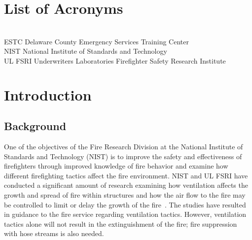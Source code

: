 \documentclass[12pt,oneside]{book}
\begin{document}
\cleardoublepage
{}
{}
\tableofcontents

\cleardoublepage
{}
{}
\listoffigures

\cleardoublepage
{}
{}
\listoftables

\chapter{List of Acronyms}

\begin{tabbing}
\hspace{1.5in} \= \\
ESTC \> Delaware County Emergency Services Training Center \\
NIST \> National Institute of Standards and Technology \\
UL FSRI \> Underwriters Laboratories Firefighter Safety Research Institute
\end{tabbing}

\newpage


\mainmatter


\chapter{Introduction}
\label{chap:intro}
\section{Background}
\label{sec:background}

One of the objectives of the Fire Research Division at the National Institute of Standards and Technology (NIST) is to improve the safety and effectiveness of firefighters through improved knowledge of fire behavior and examine how different firefighting tactics affect the fire environment. NIST and UL FSRI have conducted a significant amount of research examining how ventilation affects the growth and spread of fire within structures and how the air flow to the fire may be controlled to limit or delay the growth of the fire~\cite{madrzykowski2009fire,kerber2009fire}. The studies have resulted in guidance to the fire service regarding ventilation tactics. However, ventilation tactics alone will not result in the extinguishment of the fire; fire suppression with hose streams is also needed.
\end{document}
